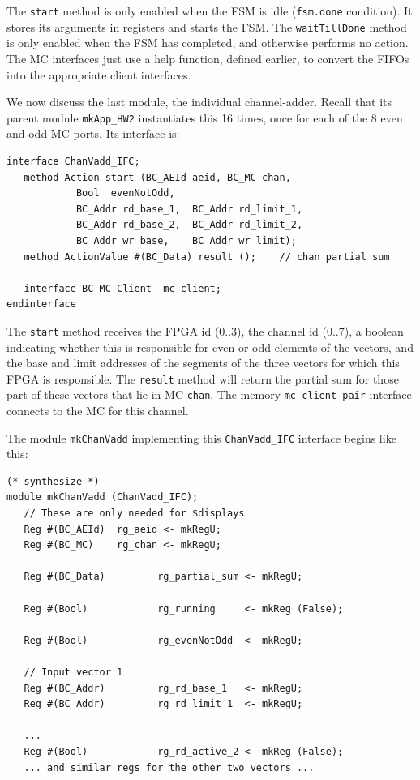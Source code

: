 \documentclass[twoside,letterpaper,11pt]{article}
\begin{document}
The \verb|start| method is only enabled when the FSM is idle
(\verb|fsm.done| condition). It stores its arguments in registers and
starts the FSM.  The \verb|waitTillDone| method is only enabled when
the FSM has completed, and otherwise performs no action.  The MC
interfaces just use a help function, defined earlier, to convert the
FIFOs into the appropriate client interfaces.

We now discuss the last module, the individual channel-adder.  Recall
that its parent module \verb|mkApp_HW2| instantiates this 16 times,
once for each of the 8 even and odd MC ports.  Its interface is:

\begin{Verbatim}[frame=single, label=App\_HW\_v0.bsv] 
interface ChanVadd_IFC;
   method Action start (BC_AEId aeid, BC_MC chan,
			Bool  evenNotOdd,
			BC_Addr rd_base_1,  BC_Addr rd_limit_1,
			BC_Addr rd_base_2,  BC_Addr rd_limit_2,
			BC_Addr wr_base,    BC_Addr wr_limit);
   method ActionValue #(BC_Data) result ();    // chan partial sum

   interface BC_MC_Client  mc_client;
endinterface
\end{Verbatim}

The \verb|start| method receives the FPGA id (0..3), the channel id
(0..7), a boolean indicating whether this is responsible for even or
odd elements of the vectors, and the base and limit addresses of the
segments of the three vectors for which this FPGA is responsible.  The
\verb|result| method will return the partial sum for those part of
these vectors that lie in MC \verb|chan|.  The memory
\verb|mc_client_pair| interface connects to the MC for this channel.

The module \verb|mkChanVadd| implementing this \verb|ChanVadd_IFC|
interface begins like this:
\begin{Verbatim}[frame=single, label=App\_HW\_v0.bsv] 
(* synthesize *)
module mkChanVadd (ChanVadd_IFC);
   // These are only needed for $displays
   Reg #(BC_AEId)  rg_aeid <- mkRegU;
   Reg #(BC_MC)    rg_chan <- mkRegU;

   Reg #(BC_Data)         rg_partial_sum <- mkRegU;

   Reg #(Bool)            rg_running     <- mkReg (False);

   Reg #(Bool)            rg_evenNotOdd  <- mkRegU;

   // Input vector 1
   Reg #(BC_Addr)         rg_rd_base_1   <- mkRegU;
   Reg #(BC_Addr)         rg_rd_limit_1  <- mkRegU;

   ...
   Reg #(Bool)            rg_rd_active_2 <- mkReg (False);
   ... and similar regs for the other two vectors ...
\end{Verbatim}
\end{document}
